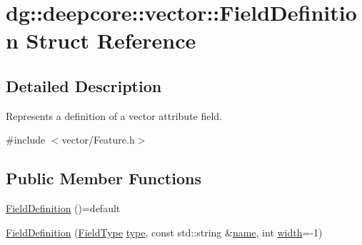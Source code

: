 \hypertarget{structdg_1_1deepcore_1_1vector_1_1_field_definition}{}\section{dg\+:\+:deepcore\+:\+:vector\+:\+:Field\+Definition Struct Reference}
\label{structdg_1_1deepcore_1_1vector_1_1_field_definition}


\subsection{Detailed Description}
Represents a definition of a vector attribute field. 

{\ttfamily \#include $<$vector/\+Feature.\+h$>$}

\subsection*{Public Member Functions}
\begin{DoxyCompactItemize}
\item 
\hyperlink{structdg_1_1deepcore_1_1vector_1_1_field_definition_a66655d2ec495781c6c6a913d4e8bb560}{Field\+Definition} ()=default
\item 
\hyperlink{structdg_1_1deepcore_1_1vector_1_1_field_definition_a92e616a840d05c28632c3013b319b699}{Field\+Definition} (\hyperlink{group___vector_module_gaedcee2e418daac47dd4516efa9a0b99d}{Field\+Type} \hyperlink{structdg_1_1deepcore_1_1vector_1_1_field_definition_a50e975eabe1343b91e398322cc990aea}{type}, const std\+::string \&\hyperlink{structdg_1_1deepcore_1_1vector_1_1_field_definition_afe210a024b6230d92260b73d4b0354b9}{name}, int \hyperlink{structdg_1_1deepcore_1_1vector_1_1_field_definition_ae8230841926a1f3c2800397adad755d4}{width}=-\/1)
\end{DoxyCompactItemize}
